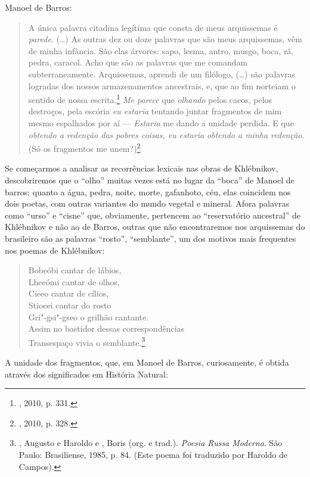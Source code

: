 Manoel de Barros:

\begin{quote}
A única palavra citadina legítima que consta de meus arquissemas é
\emph{parede}. (\ldots{}) As outras dez ou doze palavras que são meus
arquissemas, vêm de minha infância. São elas árvores: sapo, lesma,
antro, musgo, boca, rã, pedra, caracol. Acho que são as palavras que me
comandam subterraneamente. Arquissemas, aprendi de um filólogo, (\ldots{}) são
palavras logradas dos nossos armazenamentos ancestrais, e, que ao fim
norteiam o sentido de nossa escrita.\footnote{, 2010, p. 331.}
\emph{Me parece} que \emph{olhando} pelos cacos, pelos destroços, pela
escória \emph{eu estaria} tentando juntar fragmentos de mim mesmo
espalhados por aí --- \emph{Estaria} me dando a unidade perdida. E
que \emph{obtendo a redenção das pobres coisas, eu estaria obtendo a
minha redenção}. (Só os fragmentos me unem?)\footnote{, 2010, p.
  328.}
\end{quote}

Se começarmos a analisar as recorrências lexicais nas obras de
Khlébnikov, descobriremos que o ``olho'' muitas vezes está no lugar da
``boca'' de Manoel de barros; quanto a água, pedra, noite, morte,
gafanhoto, céu, elas coincidem nos dois poetas, com outras variantes do
mundo vegetal e mineral. Afora palavras como ``urso'' e ``cisne'' que,
obviamente, pertencem ao ``reservatório ancestral'' de Khlébnikov e não
ao de Barros, outras que não encontraremos nos arquissemas do brasileiro
são as palavras ``rosto'', ``semblante'', um dos motivos mais frequentes
nos poemas de Khlébnikov:

\begin{verse}
Bobeóbi cantar de lábios,\\
Lheeómi cantar de olhos,\\
Cieeo cantar de cílios,\\
Stioeei cantar do rosto\\
Gri"-gsi"-gseo o grilhão cantante.\\
Assim no bastidor dessas correspondências\\
Transespaço vivia o semblante.\footnote{, Augusto
  e Haroldo e , Boris (org. e trad.). \emph{Poesia Russa
  Moderna}. São Paulo: Brasiliense, 1985, p. 84. (Este poema foi
  traduzido por Haroldo de Campos).}
\end{verse}

A unidade dos fragmentos, que, em Manoel de Barros, curiosamente, é
obtida através dos significados em História Natural:


